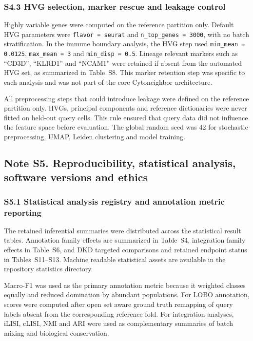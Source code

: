 \documentclass[11pt]{article}
\begin{document}
\subsubsection*{S4.3 HVG selection, marker rescue and leakage control}

Highly variable genes were computed on the reference partition only. Default HVG parameters were \texttt{flavor = seurat} and \texttt{n\_top\_genes = 3000}, with no batch stratification. In the immune boundary analysis, the HVG step used \texttt{min\_mean = 0.0125}, \texttt{max\_mean = 3} and \texttt{min\_disp = 0.5}. Lineage relevant markers such as ``CD3D'', ``KLRD1'' and ``NCAM1'' were retained if absent from the automated HVG set, as summarized in Table~S8. This marker retention step was specific to each analysis and was not part of the core Cytoneighbor architecture.

All preprocessing steps that could introduce leakage were defined on the reference partition only. HVGs, principal components and reference dictionaries were never fitted on held-out query cells. This rule ensured that query data did not influence the feature space before evaluation. The global random seed was 42 for stochastic preprocessing, UMAP, Leiden clustering and model training.

\subsection*{Note S5. Reproducibility, statistical analysis, software versions and ethics}

\subsubsection*{S5.1 Statistical analysis registry and annotation metric reporting}

The retained inferential summaries were distributed across the statistical result tables. Annotation family effects are summarized in Table~S4, integration family effects in Table~S6, and DKD targeted comparisons and retained endpoint status in Tables~S11--S13. Machine readable statistical assets are available in the repository statistics directory.

Macro-F1 was used as the primary annotation metric because it weighted classes equally and reduced domination by abundant populations. For LOBO annotation, scores were computed after open set aware ground truth remapping of query labels absent from the corresponding reference fold. For integration analyses, iLISI, cLISI, NMI and ARI were used as complementary summaries of batch mixing and biological conservation.
\end{document}
